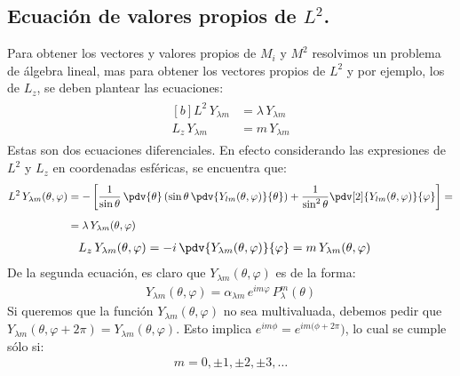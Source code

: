 \subsection{Ecuación de valores propios de \texorpdfstring{$L^{2}$.}{L2}}

Para obtener los vectores y valores propios de $M_{i}$ y $M^{2}$ resolvimos un problema de álgebra lineal, mas para obtener los vectores propios de $L^{2}$ y por ejemplo, los de $L_{z}$, se deben plantear las ecuaciones:
\begin{align}
\begin{aligned}[b]
L^{2} \, Y_{\lambda m} &= \lambda \, Y_{\lambda m} \\[0.5em]
L_{z} \, Y_{\lambda m} &= m \, Y_{\lambda m}
\end{aligned}
\label{eq:ecuacion_10_110}
\end{align}
Estas son dos ecuaciones diferenciales. En efecto considerando las expresiones de $L^{2}$ y $L_{z}$ en coordenadas esféricas, se encuentra que:
\begin{align}
\begin{aligned}[b]
L^{2} \, Y_{\lambda m} (\theta, \varphi) &= - \left[ \dfrac{1}{\sin \theta} \, \pdv{\theta} \left( \sin \theta \, \pdv{Y_{lm} (\theta, \varphi)}{\theta} \right) + \dfrac{1}{\sin^{2} \theta} \pdv[2]{Y_{lm} (\theta, \varphi)}{\varphi}  \right] = \\[0.5em]
&= \lambda \, Y_{\lambda m} (\theta, \varphi)
\end{aligned}
\label{eq:ecuacion_10_111}
\end{align}
\begin{align}
L_{z} \, Y_{\lambda m} (\theta, \varphi) &= - i \, \pdv{Y_{\lambda m} (\theta, \varphi)}{\varphi} = m \, Y_{\lambda m} (\theta, \varphi) \label{eq:ecuacion_10_112}
\end{align}
De la segunda ecuación, es claro que $Y_{\lambda m} (\theta, \varphi)$ es de la forma:
\begin{align}
Y_{\lambda m} (\theta, \varphi) = \alpha_{\lambda m} \, e^{i m \varphi} \, P_{\lambda}^{m} (\theta)
\label{eq:ecuacion_10_113}
\end{align}
Si queremos que la función $Y_{\lambda m} (\theta, \varphi) $ no sea multivaluada, debemos pedir que $Y_{\lambda m} (\theta, \varphi + 2 \pi) = Y_{\lambda m} (\theta, \varphi)$. Esto implica $e^{i m \phi} = e^{i m (\phi + 2\pi})$, lo cual se cumple sólo si:
\begin{align}
m = 0, \pm 1, \pm 2, \pm 3, \ldots
\label{eq:ecuacion_10_114}
\end{align}
